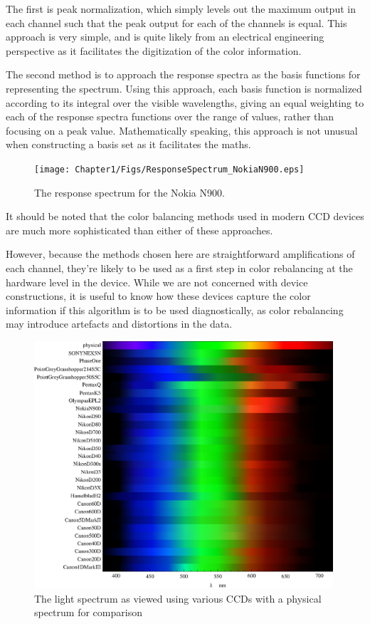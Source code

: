 The first is peak normalization, which simply levels out the maximum output in each channel such that the peak output for each of the channels is equal. This approach is very simple, and is quite likely from an electrical engineering perspective as it facilitates the digitization of the color information.

The second method is to approach the response spectra as the basis functions for representing the spectrum. Using this approach, each basis function is normalized according to its integral over the visible wavelengths, giving an equal weighting to each of the response spectra functions over the range of values, rather than focusing on a peak value. Mathematically speaking, this approach is not unusual when constructing a basis set as it facilitates the maths.

\begin{figure}[h!]
  \centering
    \texttt{[image: Chapter1/Figs/ResponseSpectrum\_NokiaN900.eps]}
    \caption{The response spectrum for the Nokia N900. }  \label{fig:ResponseSpectumNokia}
\end{figure}



It should be noted that the color balancing methods used in modern CCD devices are much more sophisticated than either of these approaches.

However, because the methods chosen here are straightforward amplifications of each channel, they're likely to be used as a first step in color rebalancing at the hardware level in the device. While we are not concerned with device constructions, it is useful to know how these devices capture the color information if this algorithm is to be used diagnostically, as color rebalancing may introduce artefacts and distortions in the data.


\begin{figure}[h!]
  \centering
    \includegraphics[width=0.99\textwidth]{Chapter1/Figs/ResponseSpectraStripes.eps}
    \caption{The light spectrum as viewed using various CCDs with a physical spectrum for comparison }  \label{fig:ResponseSpectraStripes}
\end{figure}

